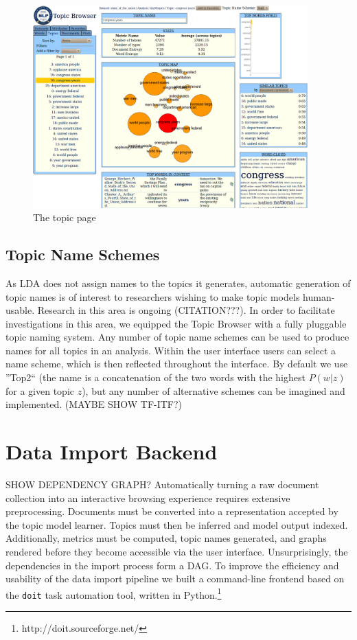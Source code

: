 \documentclass[11pt]{article}
\begin{document}
\begin{figure}[p]
 \centering
 \includegraphics[width=400px,keepaspectratio=true]{./topic_page_huge_cropped.png}
 \caption{The topic page}
 \label{fig:topic_page}
\end{figure}

\subsection{Topic Name Schemes}
As LDA does not assign names to the topics it generates, automatic generation of
topic names is of interest to researchers wishing to make topic models
human-usable. Research in this area is ongoing (CITATION???). In order to
facilitate investigations in this area, we equipped the Topic Browser with a
fully pluggable topic naming system. Any number of topic name schemes can be
used to produce names for all topics in an analysis. Within the user interface
users can select a name scheme, which is then reflected throughout the
interface. By default we use ''Top2`` (the name is a concatenation of the two
words with the highest $P(w|z)$ for a given topic $z$), but any number of
alternative schemes can be imagined and implemented. (MAYBE SHOW TF-ITF?)

\section{Data Import Backend}
SHOW DEPENDENCY GRAPH?
Automatically turning a raw document collection into an interactive browsing
experience requires extensive preprocessing. Documents must be converted into a
representation accepted by the topic model learner. Topics must then be inferred
and model output indexed. Additionally, metrics must be computed, topic names
generated, and graphs rendered before they become accessible via the user
interface. Unsurprisingly, the dependencies in the import process form a DAG. To
improve the efficiency and usability of the data import pipeline we built a
command-line frontend based on the \verb/doit/ task automation tool, written in
Python.\footnote{http://doit.sourceforge.net/}
\end{document}
